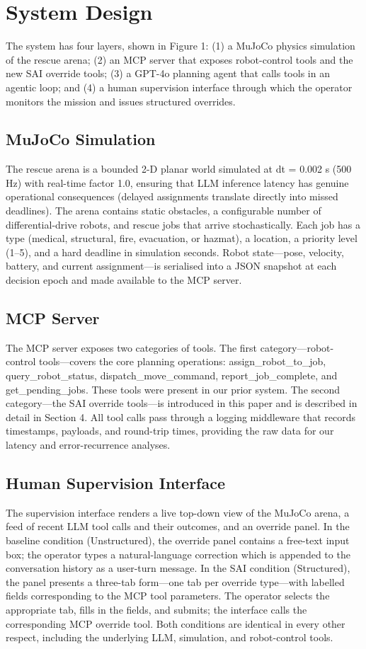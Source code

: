 \section{System Design}

The system has four layers, shown in Figure 1: (1) a MuJoCo physics simulation of the rescue arena; (2) an MCP server that exposes robot-control tools and the new SAI override tools; (3) a GPT-4o planning agent that calls tools in an agentic loop; and (4) a human supervision interface through which the operator monitors the mission and issues structured overrides.

\subsection{MuJoCo Simulation}
The rescue arena is a bounded 2-D planar world simulated at dt = 0.002 s (500 Hz) with real-time factor 1.0, ensuring that LLM inference latency has genuine operational consequences (delayed assignments translate directly into missed deadlines). The arena contains static obstacles, a configurable number of differential-drive robots, and rescue jobs that arrive stochastically. Each job has a type (medical, structural, fire, evacuation, or hazmat), a location, a priority level (1–5), and a hard deadline in simulation seconds. Robot state—pose, velocity, battery, and current assignment—is serialised into a JSON snapshot at each decision epoch and made available to the MCP server.

\subsection{MCP Server}
The MCP server exposes two categories of tools. The first category—robot-control tools—covers the core planning operations: assign_robot_to_job, query_robot_status, dispatch_move_command, report_job_complete, and get_pending_jobs. These tools were present in our prior system. The second category—the SAI override tools—is introduced in this paper and is described in detail in Section 4. All tool calls pass through a logging middleware that records timestamps, payloads, and round-trip times, providing the raw data for our latency and error-recurrence analyses.

\subsection{Human Supervision Interface}
The supervision interface renders a live top-down view of the MuJoCo arena, a feed of recent LLM tool calls and their outcomes, and an override panel. In the baseline condition (Unstructured), the override panel contains a free-text input box; the operator types a natural-language correction which is appended to the conversation history as a user-turn message. In the SAI condition (Structured), the panel presents a three-tab form—one tab per override type—with labelled fields corresponding to the MCP tool parameters. The operator selects the appropriate tab, fills in the fields, and submits; the interface calls the corresponding MCP override tool. Both conditions are identical in every other respect, including the underlying LLM, simulation, and robot-control tools.

